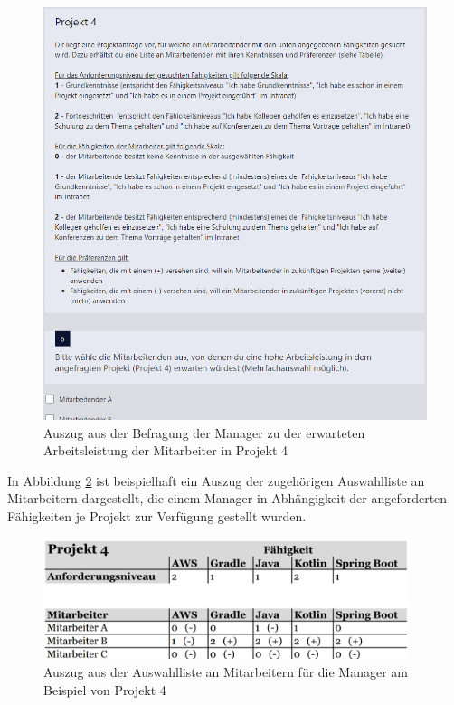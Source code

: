 \begin{figure}[H]
    \centering
	\includegraphics[width=1\textwidth]{gfx/befragung-arbeitsleistung.png}
	\caption[Auszug aus der Befragung der Manager zu der erwarteten Arbeitsleistung der Mitarbeiter in Projekt 4]{Auszug aus der Befragung der Manager zu der erwarteten Arbeitsleistung der Mitarbeiter in Projekt 4}
	\label{fig:methodik:abb6}
\end{figure}

In Abbildung \ref{fig:methodik:abb7} ist beispielhaft ein Auszug der zugehörigen Auswahlliste an Mitarbeitern dargestellt, die einem Manager in Abhängigkeit der angeforderten Fähigkeiten je Projekt zur Verfügung gestellt wurden.

\begin{figure}[H]
    \centering
	\includegraphics[width=0.95\textwidth]{gfx/befragung-arbeitsleistung-liste-ma.png}
	\caption[Auszug aus der Auswahlliste an Mitarbeitern für die Manager am Beispiel von Projekt 4]{Auszug aus der Auswahlliste an Mitarbeitern für die Manager am Beispiel von Projekt 4}
	\label{fig:methodik:abb7}
\end{figure}

